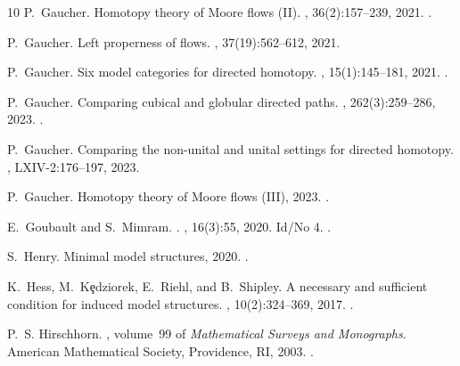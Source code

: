 \documentclass[a4paper,12pt]{amsart}
\theoremstyle{definition}
\begin{document}
\begin{thebibliography}{10}
	P.~Gaucher.
	\newblock Homotopy theory of {M}oore flows ({II}).
	, 36(2):157--239, 2021.
	\newblock \href {https://doi.org/10.17398/2605-5686.36.2.157}
	{}.
	
	P.~Gaucher.
	\newblock Left properness of flows.
	, 37(19):562--612, 2021.
	
	P.~Gaucher.
	\newblock Six model categories for directed homotopy.
	, 15(1):145--181, 2021.
	\newblock \href {https://doi.org/10.52547/cgasa.15.1.145}
	{}.
	
	P.~Gaucher.
	\newblock Comparing cubical and globular directed paths.
	, 262(3):259--286, 2023.
	\newblock \href {https://doi.org/10.4064/fm219-3-2023}
	{}.
	
	P.~Gaucher.
	\newblock Comparing the non-unital and unital settings for directed homotopy.
	, LXIV-2:176--197, 2023.
	
	P.~Gaucher.
	\newblock Homotopy theory of {M}oore flows ({III}), 2023.
	\newblock \href {https://doi.org/10.48550/arXiv.2303.16174}
	{}.
	
	E.~{Goubault} and S.~{Mimram}.
	.
	, 16(3):55, 2020.
	\newblock Id/No 4.
	\newblock \href {https://doi.org/10.23638/LMCS-16(3:4)2020}
	{}.
	
	S.~Henry.
	\newblock Minimal model structures, 2020.
	\newblock \href {https://doi.org/10.48550/arXiv.2011.13408}
	{}.
	
	K.~Hess, M.~K\c{e}dziorek, E.~Riehl, and B.~Shipley.
	\newblock A necessary and sufficient condition for induced model structures.
	, 10(2):324--369, 2017.
	\newblock \href {https://doi.org/10.1112/topo.12011}
	{}.
	
	P.~S. Hirschhorn.
	, volume~99 of {\em
		Mathematical Surveys and Monographs}.
	\newblock American Mathematical Society, Providence, RI, 2003.
	\newblock \href {https://doi.org/10.1090/surv/099}
	{}.
	

\end{thebibliography}
\end{document}
